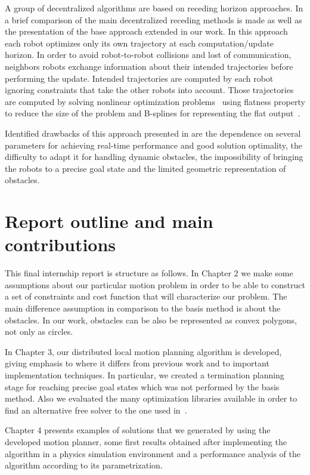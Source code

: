A group of decentralized algorithms are based on receding horizon approaches.
In \cite{Defoort2009} a brief comparison of the main decentralized receding 
methods is made as well as the presentation of the base approach extended in
our work.
In this approach each robot optimizes only its own 
trajectory at each computation/update horizon. In order to
avoid robot-to-robot collisions and lost of communication, neighbors robots 
exchange information about their intended trajectories before 
performing the update. Intended trajectories are computed by each robot
ignoring constraints that take the other robots into account.
Those trajectories are computed by
solving nonlinear optimization problems~\cite{betts1998survey}
using flatness property to reduce the size of the problem and B-splines for representing
the flat output~\cite{milam2003real}.

Identified drawbacks of this approach presented in \cite{Defoort2009} are the dependence on 
several parameters for achieving real-time performance and good solution 
optimality, the difficulty to adapt it for handling dynamic obstacles, the 
impossibility of bringing the robots to a precise goal state and the limited
geometric representation of obstacles.

\section{Report outline and main contributions}

This final internship report is structure as follows. In Chapter 2 we make some assumptions about our particular motion problem in order to be able to construct a set of constraints and cost function that will characterize our problem. The main difference assumption in comparison to the basis method is about the obstacles. In our work, obstacles can be also be represented as convex polygons, not only as circles.

In Chapter 3, our distributed local motion planning algorithm is developed, giving emphasis to where it differs from previous 
work and to important implementation techniques. In particular, we created a termination planning stage for reaching precise goal states which was not performed by the basis method. Also we evaluated the many optimization libraries available in order to find an alternative free solver to the one used in~\cite{Defoort2007a}.

Chapter 4 presents examples of solutions that we generated by using the developed motion planner, some first results obtained after implementing the algorithm in a physics simulation environment and a performance analysis of the algorithm according to its parametrization.

